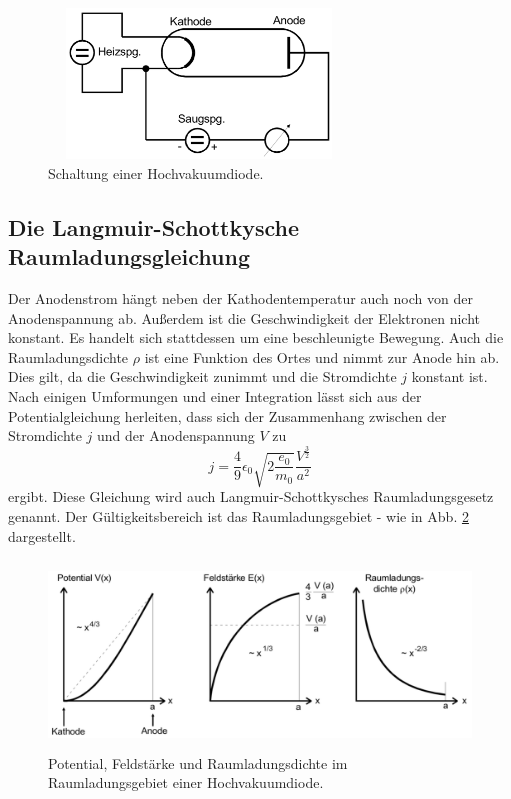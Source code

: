 \begin{figure}
    \centering
    \includegraphics[width=8cm, height=4cm]{build/diode.png}
    \caption{Schaltung einer Hochvakuumdiode. \cite{V504}}
    \label{fig:diode}
\end{figure}

\subsection{Die Langmuir-Schottkysche Raumladungsgleichung}

Der Anodenstrom hängt neben 
der Kathodentemperatur auch noch von der Anodenspannung 
ab. Außerdem ist die Geschwindigkeit der Elektronen nicht 
konstant. Es handelt sich stattdessen um eine beschleunigte 
Bewegung. Auch die Raumladungsdichte $\rho$ ist eine Funktion 
des Ortes und nimmt zur Anode hin ab. Dies gilt, da die 
Geschwindigkeit zunimmt und die Stromdichte $j$ konstant ist. 
Nach einigen Umformungen und einer Integration lässt sich aus 
der Potentialgleichung herleiten, dass sich der Zusammenhang 
zwischen der Stromdichte $j$ und der Anodenspannung $V$ 
zu 
\begin{equation}
    j = \frac{4}{9} \epsilon_0 \sqrt{2 \frac{e_0}{m_0}} \frac{V^{\frac{3}{2}}}{a^2}
    \label{eqn:langmuirschottky}
\end{equation}
ergibt. Diese Gleichung wird auch Langmuir-Schottkysches 
Raumladungsgesetz genannt. Der Gültigkeitsbereich ist das 
Raumladungsgebiet - wie in Abb. \ref{fig:langmuirschottky}
dargestellt.  

\begin{figure}
    \centering
    \includegraphics[width=13cm, height=5cm]{build/raumladungsgebiet.png}
    \caption{Potential, Feldstärke und Raumladungsdichte im Raumladungsgebiet
        einer Hochvakuumdiode. \cite{V504}}
    \label{fig:langmuirschottky}
\end{figure}


